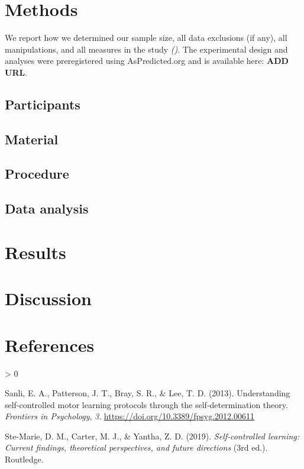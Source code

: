 \documentclass[
  english,
  jou]{apa7}
\newlength{\cslhangindent}
\newenvironment{CSLReferences}[2] %
 {%
  \setlength{\parindent}{0pt}
  \ifodd #1 \everypar{\setlength{\hangindent}{\cslhangindent}}\ignorespaces\fi
  \ifnum #2 > 0
  \setlength{\parskip}{#2\baselineskip}
  \fi
 }%
 {}
\begin{document}
\hypertarget{methods}{%
\section{Methods}\label{methods}}

We report how we determined our sample size, all data exclusions (if any), all manipulations, and all measures in the study \emph{()}. The experimental design and analyses were preregistered using AsPredicted.org and is available here: \textbf{ADD URL}.

\hypertarget{participants}{%
\subsection{Participants}\label{participants}}

\hypertarget{material}{%
\subsection{Material}\label{material}}

\hypertarget{procedure}{%
\subsection{Procedure}\label{procedure}}

\hypertarget{data-analysis}{%
\subsection{Data analysis}\label{data-analysis}}

\hypertarget{results}{%
\section{Results}\label{results}}

\hypertarget{discussion}{%
\section{Discussion}\label{discussion}}

\newpage

\hypertarget{references}{%
\section{References}\label{references}}

\begingroup
\setlength{\parindent}{-0.5in}
\setlength{\leftskip}{0.5in}

\hypertarget{refs}{}
\begin{CSLReferences}{1}{0}
\leavevmode\hypertarget{ref-sanli2013}{}%
Sanli, E. A., Patterson, J. T., Bray, S. R., \& Lee, T. D. (2013). Understanding self-controlled motor learning protocols through the self-determination theory. \emph{Frontiers in Psychology}, \emph{3}. \url{https://doi.org/10.3389/fpsyg.2012.00611}

\leavevmode\hypertarget{ref-ste-marie2019}{}%
Ste-Marie, D. M., Carter, M. J., \& Yantha, Z. D. (2019). \emph{Self-controlled learning: Current findings, theoretical perspectives, and future directions} (3rd ed.). Routledge.

\end{CSLReferences}

\endgroup
\end{document}
